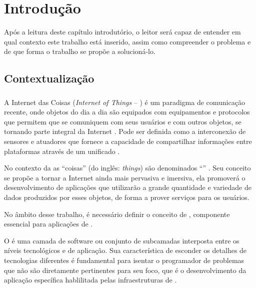 \chapter{Introdução}

Após a leitura deste capítulo introdutório, o leitor será capaz de entender em qual contexto este trabalho está inserido, assim como compreender o problema e de que forma o trabalho se propõe a solucioná-lo.

\section{Contextualização}

\subsection{\iot}

A Internet das Coisas (\textit{Internet of Things} -- \iot) é um paradigma de comunicação recente, onde objetos do dia a dia são equipados com equipamentos e protocolos que permitem que se comuniquem com seus usuários e com outros objetos, se tornando parte integral da Internet \cite{Atzori:2010}.  Pode ser definida como a interconexão de sensores e atuadores que fornece a capacidade de compartilhar informações entre plataformas através de um \framework{} unificado \cite{gubbi2013internet}. 

No contexto da \iot{} as ``coisas'' (do inglês: \textit{things}) são denominados ``\smartobjs'' \cite{bandyopadhyay2011internet}. Seu conceito se propõe a tornar a Internet ainda mais pervasiva e imersiva, ela promoverá o desenvolvimento de aplicações que utilizarão a grande quantidade e variedade de dados produzidos por esses objetos, de forma a prover serviços para os usuários. 


No âmbito desse trabalho, é necessário definir o conceito de \middleware{}, componente essencial para aplicações de \iot{}.
\begin{citacao}
	O \middleware{} é uma camada de software ou conjunto de subcamadas interposta entre os níveis tecnológicos e de aplicação. Sua característica de esconder os detalhes de tecnologias diferentes é fundamental para isentar o programador de problemas que não são diretamente pertinentes para seu foco, que é o desenvolvimento da aplicação específica hablilitada pelas infraestruturas de \iot{} \cite[tradução~nossa]{Atzori:2010}.
\end{citacao}


